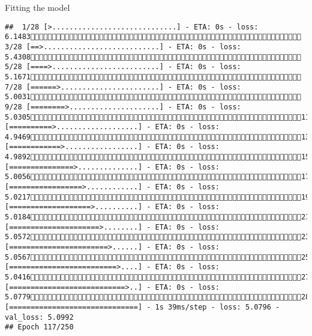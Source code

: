 \documentclass[
  ignorenonframetext,
]{beamer}
\begin{document}
\begin{frame}[fragile]{Fitting the model}
\begin{verbatim}
##  1/28 [>.............................] - ETA: 0s - loss: 6.1483 3/28 [==>...........................] - ETA: 0s - loss: 5.4308 5/28 [====>.........................] - ETA: 0s - loss: 5.1671 7/28 [======>.......................] - ETA: 0s - loss: 5.0031 9/28 [========>.....................] - ETA: 0s - loss: 5.030511/28 [==========>...................] - ETA: 0s - loss: 4.946913/28 [============>.................] - ETA: 0s - loss: 4.989215/28 [===============>..............] - ETA: 0s - loss: 5.005617/28 [=================>............] - ETA: 0s - loss: 5.021719/28 [===================>..........] - ETA: 0s - loss: 5.018421/28 [=====================>........] - ETA: 0s - loss: 5.057223/28 [=======================>......] - ETA: 0s - loss: 5.056725/28 [=========================>....] - ETA: 0s - loss: 5.041627/28 [===========================>..] - ETA: 0s - loss: 5.077928/28 [==============================] - 1s 39ms/step - loss: 5.0796 - val_loss: 5.0992
## Epoch 117/250

\end{verbatim}
\end{frame}
\end{document}
